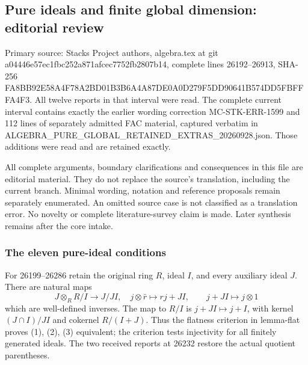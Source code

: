 \subsection{Pure ideals and finite global dimension: editorial review}\label{algebra-proof-022-pure-ideals-and-finite-global-dimension-editorial-review}

Primary source: Stacks Project authors, algebra.tex at git a044\allowbreak{}46e5\allowbreak{}7ec1\allowbreak{}fbc2\allowbreak{}52a8\allowbreak{}71af\allowbreak{}cec7\allowbreak{}752f\allowbreak{}b280\allowbreak{}7b14, complete lines 26192--26913, SHA-256 FA8B\allowbreak{}B92E\allowbreak{}58A4\allowbreak{}F78A\allowbreak{}2BD0\allowbreak{}1B3B\allowbreak{}6A4A\allowbreak{}87DE\allowbreak{}0A0D\allowbreak{}279F\allowbreak{}5DD9\allowbreak{}0641\allowbreak{}B574\allowbreak{}DD5F\allowbreak{}BFFF\allowbreak{}A4F3. All twelve reports in that interval were read. The complete current interval contains exactly the earlier wording correction MC-STK-ERR-1599 and 112 lines of separately admitted FAC material, captured verbatim in ALGEBRA\_\allowbreak{}PURE\_\allowbreak{}GLOBAL\_\allowbreak{}RETAINED\_\allowbreak{}EXTRAS\_\allowbreak{}20260928.\allowbreak{}json. Those additions were read and are retained exactly.

All complete arguments, boundary clarifications and consequences in this file are editorial material. They do not replace the source's translation, including the current branch. Minimal wording, notation and reference proposals remain separately enumerated. An omitted source case is not classified as a translation error. No novelty or complete literature-survey claim is made. Later synthesis remains after the core intake.

\subsubsection{The eleven pure-ideal conditions}\label{algebra-proof-022-the-eleven-pure-ideal-conditions}

For 26199--26286 retain the original ring \(R\), ideal \(I\), and every auxiliary ideal \(J\). There are natural maps \[
J\otimes_RR/I\longrightarrow J/JI,\quad j\otimes\bar r\mapsto rj+JI,
\qquad j+JI\longmapsto j\otimes1
\] which are well-defined inverses. The map to \(R/I\) is \(j+JI\mapsto j+I\), with kernel \((J\cap I)/JI\) and cokernel \(R/(I+J)\). Thus the flatness criterion in lemma-flat proves (1), (2), (3) equivalent; the criterion tests injectivity for all finitely generated ideals. The two received reports at 26232 restore the actual quotient parentheses.

